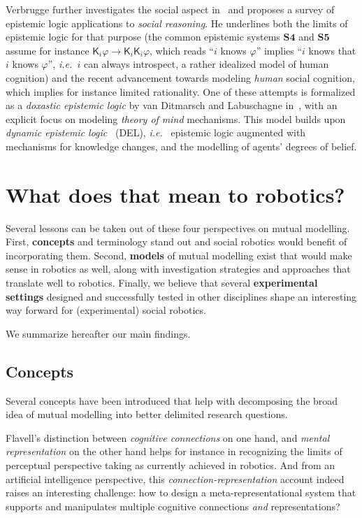 \documentclass{sig-alternate}
\newcommand{\ie}{{\textit{i.e.~}}}
\begin{document}
Verbrugge further investigates the social aspect in~\cite{verbrugge2009logic}
and proposes a survey of epistemic logic applications to \emph{social
reasoning}. He underlines both the limits of epistemic logic for that purpose
(the common epistemic systems $\mathbf{S4}$ and $\mathbf{S5}$ assume for
instance $\mathsf{K}_{i}\varphi \rightarrow
\mathsf{K}_{i}\mathsf{K}_{i}\varphi$, which reads ``$i$ knows $\varphi$''
implies ``$i$ knows that $i$ knows $\varphi$'', \ie $i$ can always introspect, a
rather idealized model of human cognition) and the recent advancement towards
modeling \emph{human} social cognition, which implies for instance limited
rationality.  One of these attempts is formalized as a \emph{doxastic epistemic
logic} by van Ditmarsch and Labuschagne in~\cite{ditmarsch2007beliefs}, with an
explicit focus on modeling \emph{theory of mind} mechanisms. This model builds
upon \emph{dynamic epistemic logic}~\cite{ditmarsch2007dynamic} (DEL), \ie
epistemic logic augmented with mechanisms for knowledge changes, and the
modelling of agents' degrees of belief.



\section{What does that mean to robotics?}

Several lessons can be taken out of these four perspectives on mutual modelling.
First, \textbf{concepts} and terminology stand out and social robotics would
benefit of incorporating them. Second, \textbf{models} of mutual modelling exist
that would make sense in robotics as well, along with investigation strategies
and approaches that translate well to robotics. Finally, we believe that several
\textbf{experimental settings} designed and successfully tested in other
disciplines shape an interesting way forward for (experimental) social robotics.

We summarize hereafter our main findings.

\subsection{Concepts}

Several concepts have been introduced that help with decomposing the broad idea
of mutual modelling into better delimited research questions.

Flavell's distinction between \emph{cognitive connections} on one hand, and
\emph{mental representation} on the other hand helps for instance in recognizing
the limits of perceptual perspective taking as currently achieved in robotics.
And from an artificial intelligence perspective, this
\emph{connection-representation} account indeed raises an interesting challenge:
how to design a meta-representational system that supports and manipulates
multiple cognitive connections \emph{and} representations?
\end{document}
